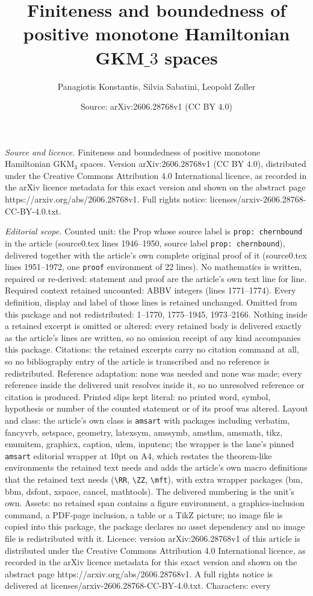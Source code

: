 \documentclass[10pt,a4paper]{amsart}
\title[Finiteness and boundedness of positive monotone Hamiltonian ]{Finiteness and boundedness of positive monotone Hamiltonian GKM$\_3$ spaces}
\author{Panagiotis Konstantis, Silvia Sabatini, Leopold Zoller}
\date{Source: arXiv:2606.28768v1 (CC BY 4.0)}
\begin{document}
\maketitle

\noindent\emph{Source and licence.} Finiteness and boundedness of positive monotone Hamiltonian GKM$_3$ spaces. Version arXiv:2606.28768v1 (CC BY 4.0), distributed under the Creative Commons Attribution 4.0 International licence, as recorded in the arXiv licence metadata for this exact version and shown on the abstract page https://arxiv.org/abs/2606.28768v1. Full rights notice: licenses/arxiv-2606.28768-CC-BY-4.0.txt.\par\smallskip

\noindent\textit{Editorial scope.} Counted unit: the Prop whose source label is \texttt{prop: chernbound} in the article (source0.tex lines 1946--1950, source label \texttt{prop: chernbound}), delivered together with the article's own complete original proof of it (source0.tex lines 1951--1972, one \texttt{proof} environment of 22 lines). No mathematics is written, repaired or re-derived: statement and proof are the article's own text line for line. Required context retained uncounted: ABBV integers (lines 1771--1774). Every definition, display and label of those lines is retained unchanged. Omitted from this package and not redistributed: 1--1770, 1775--1945, 1973--2166. Nothing inside a retained excerpt is omitted or altered: every retained body is delivered exactly as the article's lines are written, so no omission receipt of any kind accompanies this package. Citations: the retained excerpts carry no citation command at all, so no bibliography entry of the article is transcribed and no reference is redistributed. Reference adaptation: none was needed and none was made; every reference inside the delivered unit resolves inside it, so no unresolved reference or citation is produced. Printed slips kept literal: no printed word, symbol, hypothesis or number of the counted statement or of its proof was altered. Layout and class: the article's own class is \texttt{amsart} with packages including verbatim, fancyvrb, setspace, geometry, latexsym, amssymb, amsthm, amsmath, tikz, enumitem, graphicx, caption, ulem, inputenc; the wrapper is the lane's pinned \texttt{amsart} editorial wrapper at 10pt on A4, which restates the theorem-like environments the retained text needs and adds the article's own macro definitions that the retained text needs (\texttt{\textbackslash RR}, \texttt{\textbackslash ZZ}, \texttt{\textbackslash mft}), with extra wrapper packages (bm, bbm, dsfont, xspace, cancel, mathtools). The delivered numbering is the unit's own. Assets: no retained span contains a figure environment, a graphics-inclusion command, a PDF-page inclusion, a table or a TikZ picture; no image file is copied into this package, the package declares no asset dependency and no image file is redistributed with it. Licence: version arXiv:2606.28768v1 of this article is distributed under the Creative Commons Attribution 4.0 International licence, as recorded in the arXiv licence metadata for this exact version and shown on the abstract page https://arxiv.org/abs/2606.28768v1. A full rights notice is delivered at licenses/arxiv-2606.28768-CC-BY-4.0.txt. Characters: every 
\end{document}
